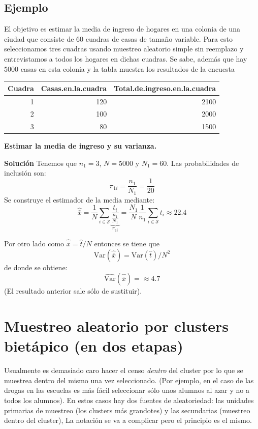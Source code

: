 \documentclass[
]{book}
\begin{document}
\hypertarget{ejemplo-5}{%
\subsection{Ejemplo}\label{ejemplo-5}}

El objetivo es estimar la media de ingreso de hogares en una colonia de una ciudad que consiste de 60 cuadras de casas de tamaño variable. Para esto seleccionamos tres cuadras usando muestreo aleatorio simple sin reemplazo y entrevistamos a todos los hogares en dichas cuadras. Se sabe, además que hay \(5000\) casas en esta colonia y la tabla muestra los resultados de la encuesta

\begin{table}
\centering
\begin{tabular}{r|r|r}
\hline
Cuadra & Casas.en.la.cuadra & Total.de.ingreso.en.la.cuadra\\
\hline
1 & 120 & 2100\\
\hline
2 & 100 & 2000\\
\hline
3 & 80 & 1500\\
\hline
\end{tabular}
\end{table}

\textbf{Estimar la media de ingreso y su varianza.}

\textbf{Solución}
Tenemos que \(n_1 = 3\), \(N = 5000\) y \(N_1 = 60\). Las probabilidades de inclusión son:
\[
\pi_{1i} = \frac{n_1}{N_1} = \frac{1}{20}
\]
Se construye el estimador de la media mediante:
\[
\hat{\bar{x}} = \frac{1}{N} \sum_{i \in \mathcal{S}} \underbrace{\dfrac{t_i}{\frac{n_1}{N_1}}}_{\pi_{1i}} =  \frac{N_1}{N} \frac{1}{n_1}\sum_{i \in \mathcal{S}}t_i \approx 22.4
\]

Por otro lado como \(\hat{\bar{x}} = \hat{t}/N\) entonces se tiene que
\[
\textrm{Var}(\hat{\bar{x}}) = \textrm{Var}(\hat{t})/N^2
\]
de donde se obtiene:
\[
\widehat{\textrm{Var}}(\hat{\bar{x}}) =\approx 4.7
\]
(El resultado anterior sale sólo de sustituir).

\hypertarget{muestreo-aleatorio-por-clusters-bietuxe1pico-en-dos-etapas}{%
\section{Muestreo aleatorio por clusters bietápico (en dos etapas)}\label{muestreo-aleatorio-por-clusters-bietuxe1pico-en-dos-etapas}}

Usualmente es demasiado caro hacer el censo \emph{dentro} del cluster por lo que se muestrea dentro del mismo una vez seleccionado. (Por ejemplo, en el caso de las drogas en las escuelas es más fácil seleccionar sólo unos alumnos al azar y no a todos los alumnos). En estos casos hay dos fuentes de aleatoriedad: las unidades primarias de muestreo (los clusters más grandotes) y las secundarias (muestreo dentro del cluster), La notación se va a complicar pero el principio es el mismo.
\end{document}
